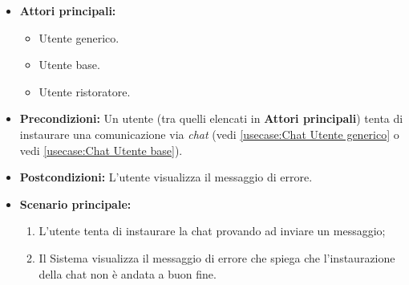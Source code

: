 \label{usecase:Errore instaurazione chat}
\begin{itemize}
    \item \textbf{Attori principali:} 
	\begin{itemize}
        \item Utente generico.
        \item Utente base.
        \item Utente ristoratore.
    \end{itemize}

	\item \textbf{Precondizioni:}
	      Un utente (tra quelli elencati in \textbf{Attori principali}) tenta di instaurare una comunicazione via \textit{chat} (vedi \autoref{usecase:Chat Utente generico} o vedi \autoref{usecase:Chat Utente base}).

	\item \textbf{Postcondizioni:}
	      L'utente visualizza il messaggio di errore.

	\item \textbf{Scenario principale:}
	      \begin{enumerate}
		      \item L'utente tenta di instaurare la chat provando ad inviare un messaggio;
		      \item Il Sistema visualizza il messaggio di errore che spiega che l'instaurazione della chat non è andata a buon fine.
	      \end{enumerate}
\end{itemize}